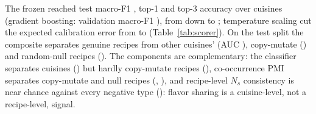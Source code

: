 \documentclass[conference]{IEEEtran}
\newcommand{\Ns}{N_s}
\begin{document}
The frozen \NClfName{} reached test macro-F1 \NClfFOne, top-1 \NClfTopOne{} and top-3 accuracy \NClfTopThree{} over \NRegions{} cuisines (gradient boosting: validation macro-F1 \NGbdtValFOne), from \NBestRegionF{} down to \NWorstRegionF; temperature scaling cut the expected calibration error from \NEceRaw{} to \NEceCal{} (Table~\ref{tab:scorer}). On the test split the composite separates genuine recipes from other cuisines' (AUC \NAucOtherComposite), copy-mutate (\NAucCMComposite) and random-null recipes (\NAucNullComposite). The components are complementary: the classifier separates cuisines (\NAucOtherClf) but hardly copy-mutate recipes (\NAucCMClf), co-occurrence PMI separates copy-mutate and null recipes (\NAucCMCooc, \NAucNullCooc), and recipe-level $\Ns$ consistency is near chance against every negative type (\NAucNsRange): flavor sharing is a cuisine-level, not a recipe-level, signal.

\begin{table}[t]
\centering\caption{Fidelity scorer on the CulinaryDB test split.}\label{tab:scorer}
\footnotesize\setlength{\tabcolsep}{3pt}
\end{table}
\end{document}
